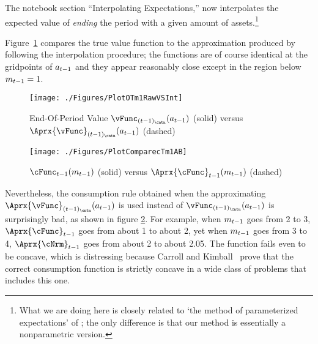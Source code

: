 \documentclass[SolvingMicroDSOPs]{subfiles}
\begin{document}
The notebook section ``Interpolating Expectations,'' now interpolates the expected value of \textit{ending} the period with a given amount of assets.\footnote{What we are doing here is closely related to `the method of parameterized expectations' of \cite{denHaanMarcet:parameterized}; the only difference is that our method is essentially a nonparametric version.}  %

Figure~\ref{fig:PlotOTm1RawVSInt} compares the true value function to the approximation produced by following the interpolation procedure; the functions are of course identical at the gridpoints of ${a}_{t-1}$ and they appear reasonably close except in the region below ${m}_{t-1}=1$.

\hypertarget{PlotOTm1RawVSInt}{}
\begin{figure}
  \centerline{\texttt{[image: ./Figures/PlotOTm1RawVSInt]}}
  \caption{End-Of-Period Value $\vFunc_{({\prdT-1})_\cntn}({a}_{\prdT-1})$ (solid) versus $\Aprx{\vFunc}_{({\prdT-1})_\cntn}({a}_{\prdT-1})$ (dashed)}
  \label{fig:PlotOTm1RawVSInt}
\end{figure}

\hypertarget{PlotComparecTm1AB}{}
\begin{figure}
  \centerline{\texttt{[image: ./Figures/PlotComparecTm1AB]}}
  \caption{$\cFunc_{\prdT-1}({m}_{\prdT-1})$ (solid) versus $\Aprx{\cFunc}_{\prdT-1}({m}_{\prdT-1})$ (dashed)}
  \label{fig:PlotComparecTm1AB}
\end{figure}


Nevertheless, the consumption rule obtained when the approximating $\Aprx{\vFunc}_{({\prdT-1})_\cntn}({a}_{\prdT-1})$ is used instead of $\vFunc_{({\prdT-1})_\cntn}({a}_{\prdT-1})$ is surprisingly bad, as shown in figure \ref{fig:PlotComparecTm1AB}.  For example, when ${m}_{t-1}$ goes from 2 to 3, $\Aprx{\cFunc}_{\prdT-1}$ goes from about 1 to about 2, yet when ${m}_{t-1}$ goes from 3 to 4, $\Aprx{\cNrm}_{\prdT-1}$ goes from about 2 to about 2.05.  The function fails even to be concave, which is distressing because Carroll and Kimball~\citeyearpar{ckConcavity} prove that the correct consumption function is strictly concave in a wide class of problems that includes this one.
\end{document}
